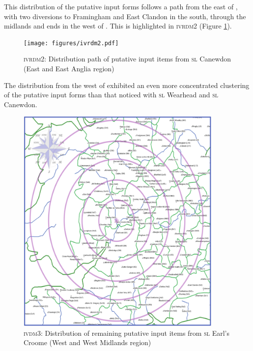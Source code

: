 This distribution of the putative input forms follows a path from the east of , with two diversions to Framingham and East Clandon in the south, through the midlands and ends in the west of . This is highlighted in \textsc{ivrdm2} (Figure \ref{5.6b}).


\begin{figure}
\texttt{[image: figures/ivrdm2.pdf]}
\addtocounter{figure}{-1}\renewcommand{\thefigure}{\arabic{figure}.6b}
\caption {\textsc{ivrdm2}: Distribution path of putative input items from \textsc{sl} Canewdon (East and East Anglia region)} 
\label{5.6b}
\end{figure}

The distribution from the west of  exhibited an even more concentrated clustering of the putative input forms than that noticed with \textsc{sl} Wearhead and \textsc{sl} Canewdon.
 

\begin{figure}
\includegraphics[width=0.9\textwidth] {figures/ivdm3.pdf}
\addtocounter{figure}{-1}\renewcommand{\thefigure}{\arabic{figure}.7a}
\caption {\textsc{ivdm3}: Distribution of remaining putative input items from \textsc{sl} Earl's Croome (West and West Midlands region)} 
\label{5.7a}
\end{figure}


